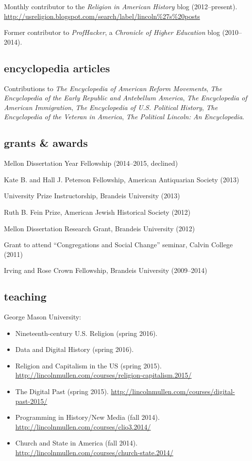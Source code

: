 \documentclass[11pt]{article}
\providecommand{\tightlist}{%
  \setlength{\itemsep}{0pt}\setlength{\parskip}{0pt}}
\begin{document}
Monthly contributor to the \emph{Religion in American History} blog (2012--present). \url{http://usreligion.blogspot.com/search/label/lincoln\%27s\%20posts}

Former contributor to \emph{ProfHacker}, a \emph{Chronicle of Higher 
  Education} blog (2010--2014). 

\subsection{encyclopedia articles}\label{encyclopedia-articles}

Contributions to \emph{The Encyclopedia of American Reform Movements},
\emph{The Encyclopedia of the Early Republic and Antebellum America},
\emph{The Encyclopedia of American Immigration},
\emph{The Encyclopedia of U.S. Political History},
\emph{The Encyclopedia of the Veteran in America},
\emph{The Political Lincoln: An Encyclopedia}.

\subsection{grants \& awards}\label{grants-awards}

Mellon Dissertation Year Fellowship (2014--2015, declined)

Kate B. and Hall J. Peterson Fellowship, American Antiquarian Society
(2013)

University Prize Instructorship, Brandeis University (2013)

Ruth B. Fein Prize, American Jewish Historical Society (2012)

Mellon Dissertation Research Grant, Brandeis University (2012)

Grant to attend ``Congregations and Social Change'' seminar, Calvin
College (2011)

Irving and Rose Crown Fellowship, Brandeis University (2009--2014)

\subsection{teaching}\label{teaching}

George Mason University:

\begin{itemize}
    \tightlist
  \item Nineteenth-century U.S. Religion (spring 2016).
  \item Data and Digital History (spring 2016).
  \item Religion and Capitalism in the US (spring 2015). 
    \url{http://lincolnmullen.com/courses/religion-capitalism.2015/}
  \item The Digital Past (spring 2015). 
    \url{http://lincolnmullen.com/courses/digital-past-2015/}
  \item
    Programming in History/New Media (fall 2014).  
    \url{http://lincolnmullen.com/courses/clio3.2014/}
  \item
    Church and State in America (fall 2014). 
    \url{http://lincolnmullen.com/courses/church-state.2014/}
\end{itemize}
\end{document}
